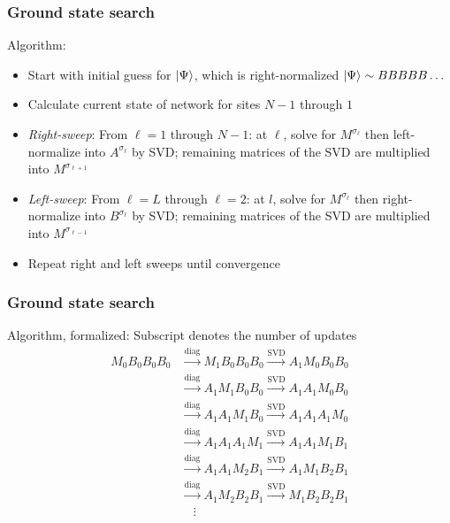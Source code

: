 \documentclass{beamer}
\theoremstyle{definition}
\begin{document}
\begin{frame}
	\frametitle{Ground state search}
	Algorithm: \vspace{5pt}
	\begin{itemize}
		\item Start with initial guess for $\ket{\Psi}$, which is right-normalized $\ket{\Psi} \sim BBBBB\dots$ \pause
		\vspace{5pt}
		\item Calculate current state of network for sites $N-1$ through $1$ \pause
		\vspace{5pt}
		\item \textit{Right-sweep}: From $\ell=1$ through $N-1$: at $\ell$, solve for $M^{\sigma_\ell}$ then left-normalize into $A^{\sigma_\ell}$ by SVD; remaining matrices of the SVD are multiplied into $M^{\sigma_{\ell+1}}$  \pause
		\vspace{5pt}
		
		\item \textit{Left-sweep}: From $\ell=L$ through $\ell=2$: at $l$, solve for $M^{\sigma_\ell}$ then right-normalize into $B^{\sigma_\ell}$ by SVD; remaining matrices of the SVD are multiplied into $M^{\sigma_{\ell-1}}$
		\vspace{5pt} \pause
		
		\item Repeat right and left sweeps until convergence
	\end{itemize}
\end{frame}


\begin{frame}
	\frametitle{Ground state search}
	
	Algorithm, formalized: Subscript denotes the number of updates
	\begin{align*}
		M_0 B_0 B_0 B_0 &\xrightarrow{\text{diag}} M_1 B_0 B_0 B_0  \xrightarrow{\text{SVD}} A_1 M_0 B_0 B_0  \\
		&\xrightarrow{\text{diag}} A_1 M_1 B_0 B_0  \xrightarrow{\text{SVD}} A_1 A_1 M_0 B_0  \\
		&\xrightarrow{\text{diag}} A_1 A_1 M_1 B_0  \xrightarrow{\text{SVD}} A_1 A_1 A_1 M_0  \\
		&\xrightarrow{\text{diag}} A_1 A_1 A_1 M_1  \xrightarrow{\text{SVD}} A_1 A_1 M_1 B_1  \\
		&\xrightarrow{\text{diag}} A_1 A_1 M_2 B_1  \xrightarrow{\text{SVD}} A_1 M_1 B_2 B_1  \\
		&\xrightarrow{\text{diag}} A_1 M_2 B_2 B_1   \xrightarrow{\text{SVD}} M_1 B_2 B_2 B_1  \\
		&\quad\vdots
	\end{align*}
	
\end{frame}
\end{document}
